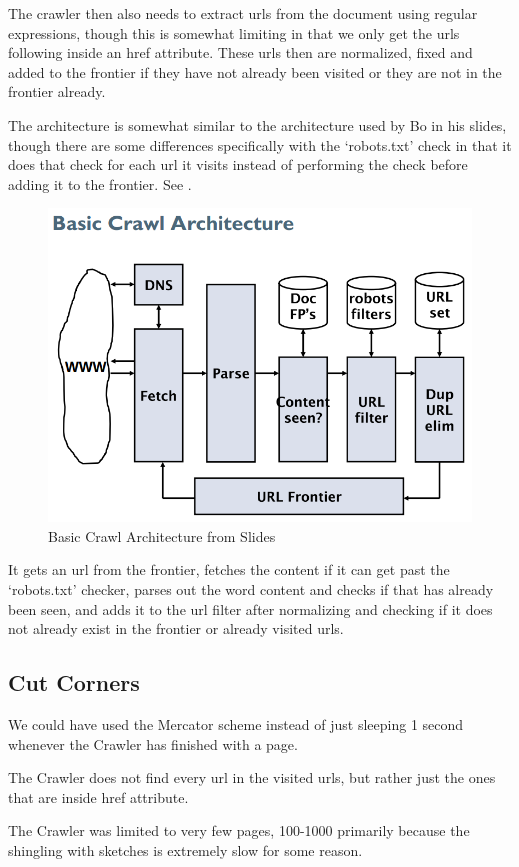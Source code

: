 	The crawler then also needs to extract urls from the document using regular expressions, though this is somewhat limiting in that we only get the urls following inside an href attribute. These urls then are normalized, fixed and added to the frontier if they have not already been visited or they are not in the frontier already.
	
	The architecture is somewhat similar to the architecture used by Bo in his slides, though there are some differences specifically with the `robots.txt' check in that it does that check for each url it visits instead of performing the check before adding it to the frontier. See .
	
	\begin{figure}[H]
	\centering
	\includegraphics[width=0.7\linewidth]{./Media/basiccrawlarchitecture}
	\caption{Basic Crawl Architecture from Slides}
	\label{fig:basiccrawlarchitecture}
	\end{figure}
	
	It gets an url from the frontier, fetches the content if it can get past the `robots.txt' checker, parses out the word content and checks if that has already been seen, and adds it to the url filter after normalizing and checking if it does not already exist in the frontier or already visited urls.
	
	\subsection{Cut Corners}
	We could have used the Mercator scheme instead of just sleeping 1 second whenever the Crawler has finished with a page.
	
	The Crawler does not find every url in the visited urls, but rather just the ones that are inside href attribute.
	
	The Crawler was limited to very few pages, 100-1000 primarily because the shingling with sketches is extremely slow for some reason.
	
